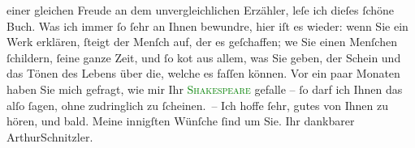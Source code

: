                     einer gleichen Freude an dem unvergleichlichen Erzähler, leſe ich dieſes ſchöne
                    Buch. Was ich immer ſo ſehr an Ihnen bewundre, hier iſt es wieder: wenn Sie ein
                    Werk erklären, ſteigt der Menſch auf, der es geſchaffen; we{\geminationn}
               Sie einen Menſchen ſchildern, ſeine ganze Zeit,
                    und {\pb}ſo ko{\geminationm}t aus
                    allem, was Sie geben, der Schein und das Tönen des Lebens über die, welche es
                    faſſen können. Vor ein paar Monaten haben Sie mich gefragt, wie mir Ihr
                        \textcolor{green}{\textsc{Shakespeare}}{}\ledrightnote{\textcolor{green}{William Shakespeare}} gefalle – ſo darf ich Ihnen das alſo ſagen, ohne zudringlich zu
                    ſcheinen. –\pend
           \pstart Ich hoffe ſehr, gutes von Ihnen zu hören, und bald. Meine innigſten Wünſche
                    ſind um Sie. Ihr dankbarer \spacefill\mbox{ArthurSchnitzler.}\pend{}\endnumbering{}  
      